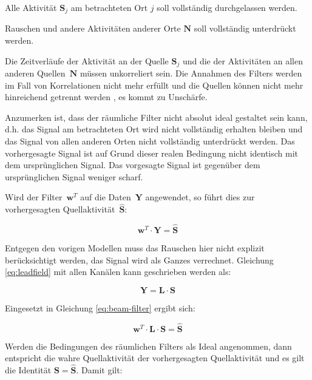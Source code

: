 \documentclass[doc,a4paper,12pt]{apa6}
\newcommand{\mx}[1]{\mathbf{#1}}
\begin{document}
\begin{compactitem}
\item Alle Aktivität $\mx{S}_j$ am betrachteten Ort $j$ soll vollständig durchgelassen werden.
\item Rauschen und andere Aktivitäten anderer Orte $\mx{N}$ soll vollständig unterdrückt werden.
\end{compactitem}

Die Zeitverläufe der Aktivität an der Quelle $\mx{S}_j$ und die der Aktivitäten an allen anderen Quellen~$\mx{N}$ müssen unkorreliert sein. Die Annahmen des Filters werden im Fall von Korrelationen nicht mehr erfüllt und die Quellen können nicht mehr hinreichend getrennt werden \parencite{van1997localization}, es kommt zu Unschärfe.

Anzumerken ist, dass der räumliche Filter nicht absolut ideal gestaltet sein kann, d.h. das Signal am betrachteten Ort wird nicht vollständig erhalten bleiben und das Signal von allen anderen Orten nicht vollständig unterdrückt werden. Das vorhergesagte Signal ist auf Grund dieser realen Bedingung nicht identisch mit dem ursprünglichen Signal. Das vorgesagte Signal ist gegenüber dem ursprünglichen Signal weniger scharf.

Wird der Filter~$\mx{w}^T$ auf die Daten~$\mx{Y}$ angewendet, so führt dies zur vorhergesagten Quellaktivität~$\mx{\hat S}$:

\begin{equation}
\label{eq:beam-filter}
\mx{w}^T \cdot \mx{Y} = \mx{\hat S}
\end{equation}

Entgegen den vorigen Modellen muss das Rauschen hier nicht explizit berücksichtigt werden, das Signal wird als Ganzes verrechnet. Gleichung \ref{eq:leadfield} mit allen Kanälen kann geschrieben werden als:

\begin{equation}
\mx{Y} = \mx{L} \cdot \mx{S}
\end{equation}

Eingesetzt in Gleichung \ref{eq:beam-filter} ergibt sich:

\begin{equation}
\mx{w}^T \cdot \mx{L} \cdot \mx{S} = \mx{\hat S}
\end{equation}

Werden die Bedingungen des räumlichen Filters als Ideal angenommen, dann entspricht die wahre Quellaktivität der vorhergesagten Quellaktivität und es gilt die Identität $\mx{S} = \mx{\hat S}$. Damit gilt:
\end{document}

